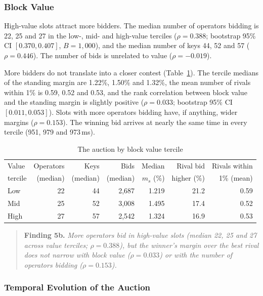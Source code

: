\documentclass[11pt]{article}
\begin{document}
\subsubsection{Block Value}
\label{sec:comp_value}

High-value slots attract more bidders. The median number of operators
bidding is 22, 25 and 27 in the low-, mid- and high-value terciles
($\rho = 0.388$; bootstrap 95\% CI $[0.370, 0.407]$, $B = 1{,}000$), and the
median number of keys 44, 52 and 57 ($\rho = 0.446$). The number of bids is
unrelated to value ($\rho = -0.019$).

More bidders do not translate into a closer contest
(Table~\ref{tab:value}). The tercile medians of the standing margin are
1.22\%, 1.50\% and 1.32\%, the mean number of rivals within 1\% is 0.59,
0.52 and 0.53, and the rank correlation between block value and the standing
margin is slightly positive ($\rho = 0.033$; bootstrap 95\% CI
$[0.011, 0.053]$). Slots with more operators bidding have, if anything,
wider margins ($\rho = 0.153$). The winning bid arrives at nearly the same
time in every tercile (951, 979 and 973\,ms).

\begin{table}[!htbp]
\centering
\caption{The auction by block value tercile}
\label{tab:value}
\begin{tabular}{lrrrrrr}
\toprule
Value & Operators & Keys & Bids & Median & Rival bid & Rivals within \\
tercile & (median) & (median) & (median) & $m_s$ (\%) & higher (\%) & 1\% (mean) \\
\midrule
Low & 22 & 44 & 2{,}687 & 1.219 & 21.2 & 0.59 \\
Mid & 25 & 52 & 3{,}008 & 1.495 & 17.4 & 0.52 \\
High & 27 & 57 & 2{,}542 & 1.324 & 16.9 & 0.53 \\
\bottomrule
\end{tabular}
\end{table}

\begin{quote}
\textbf{Finding 5b.} \textit{More operators bid in high-value slots (median
22, 25 and 27 across value terciles; $\rho = 0.388$), but the winner's
margin over the best rival does not narrow with block value
($\rho = 0.033$) or with the number of operators bidding ($\rho = 0.153$).}
\end{quote}

\subsubsection{Temporal Evolution of the Auction}
\label{sec:comp_evolution}
\end{document}
